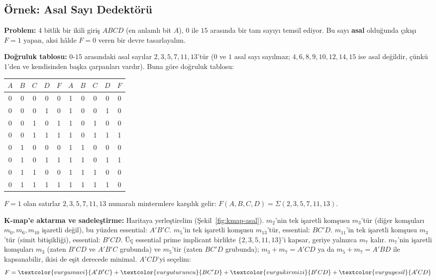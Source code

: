 \subsection{Örnek: Asal Sayı Dedektörü}\label{sec:donanim-ornek-asal}
\begin{ornek}\label{orn:asal-sayi}
\textbf{Problem:} $4$ bitlik bir ikili giriş $ABCD$ (en anlamlı bit $A$), $0$ ile $15$
arasında bir tam sayıyı temsil ediyor. Bu sayı \textbf{asal} olduğunda çıkışı $F=1$ yapan,
aksi hâlde $F=0$ veren bir devre tasarlayalım.

\textbf{Doğruluk tablosu:} $0$-$15$ arasındaki asal sayılar $2,3,5,7,11,13$'tür ($0$ ve $1$
asal sayı sayılmaz; $4,6,8,9,10,12,14,15$ ise asal değildir, çünkü $1$'den ve kendisinden
başka çarpanları vardır). Buna göre doğruluk tablosu:
\begin{center}
\begin{tabular}{cccc|c||cccc|c}
\toprule
$A$&$B$&$C$&$D$&$F$ & $A$&$B$&$C$&$D$&$F$\\
\midrule
0&0&0&0&0 & 1&0&0&0&0\\
0&0&0&1&0 & 1&0&0&1&0\\
0&0&1&0&1 & 1&0&1&0&0\\
0&0&1&1&1 & 1&0&1&1&1\\
0&1&0&0&0 & 1&1&0&0&0\\
0&1&0&1&1 & 1&1&0&1&1\\
0&1&1&0&0 & 1&1&1&0&0\\
0&1&1&1&1 & 1&1&1&1&0\\
\bottomrule
\end{tabular}
\end{center}
$F=1$ olan satırlar $2,3,5,7,11,13$ numaralı mintermlere karşılık gelir:
$F(A,B,C,D)=\Sigma(2,3,5,7,11,13)$.

\textbf{K-map'e aktarma ve sadeleştirme:} Haritaya yerleştirelim (Şekil~\ref{fig:kmap-asal}).
$m_2$'nin tek işaretli komşusu $m_3$'tür (diğer komşuları $m_0,m_6,m_{10}$ işaretli değil),
bu yüzden essential: $A'B'C$. $m_5$'in tek işaretli komşusu $m_{13}$'tür, essential: $BC'D$.
$m_{11}$'in tek işaretli komşusu $m_3$'tür (simit bitişikliği), essential: $B'CD$. Üç
essential prime implicant birlikte $\{2,3,5,11,13\}$'i kapsar, geriye yalnızca $m_7$ kalır.
$m_7$'nin işaretli komşuları $m_3$ (zaten $B'CD$ ve $A'B'C$ grubunda) ve $m_5$'tir (zaten
$BC'D$ grubunda); $m_3+m_7=A'CD$ ya da $m_5+m_7=A'BD$ ile kapsanabilir, ikisi de eşit
derecede minimal. $A'CD$'yi seçelim:
\[
F = \textcolor{vurgumavi}{A'B'C} + \textcolor{vurguturuncu}{BC'D} + \textcolor{vurgukirmizi}{B'CD} + \textcolor{vurguyesil}{A'CD}
\]


\end{ornek}
